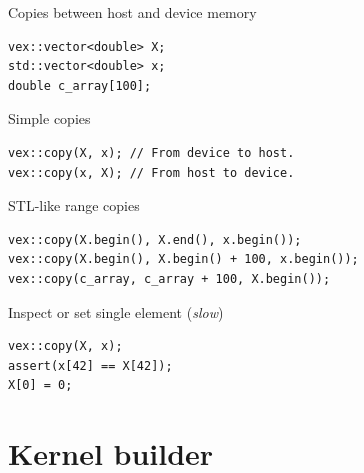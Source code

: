 \documentclass[@BEAMER_OPTIONS@]{beamer}
\begin{document}
\begin{frame}[fragile]{Copies between host and device memory}
    \begin{exampleblock}{}
        \begin{lstlisting}
vex::vector<double> X;
std::vector<double> x;
double c_array[100];
        \end{lstlisting}
    \end{exampleblock}
    \begin{exampleblock}{Simple copies}
        \begin{lstlisting}
vex::copy(X, x); // From device to host.
vex::copy(x, X); // From host to device.
        \end{lstlisting}
    \end{exampleblock}
    \begin{exampleblock}{STL-like range copies}
        \begin{lstlisting}
vex::copy(X.begin(), X.end(), x.begin());
vex::copy(X.begin(), X.begin() + 100, x.begin());
vex::copy(c_array, c_array + 100, X.begin());
        \end{lstlisting}
    \end{exampleblock}
    \begin{exampleblock}{Inspect or set single element (\emph{slow})}
        \begin{lstlisting}
vex::copy(X, x);
assert(x[42] == X[42]);
X[0] = 0;
        \end{lstlisting}
    \end{exampleblock}
\end{frame}



\section{Kernel builder}
\end{document}
